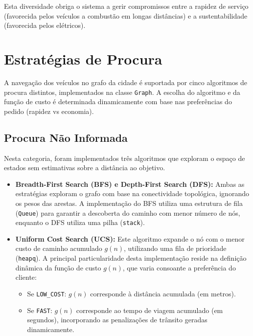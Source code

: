 \documentclass[11pt, a4paper, fleqn]{article}
\begin{document}
	Esta diversidade obriga o sistema a gerir compromissos entre a rapidez de serviço (favorecida pelos veículos a combustão em longas distâncias) e a sustentabilidade (favorecida pelos elétricos).
	
	
	
	\section{Estratégias de Procura}
	
	A navegação dos veículos no grafo da cidade é suportada por cinco algoritmos de procura distintos, implementados na classe \texttt{Graph}. A escolha do algoritmo e da função de custo é determinada dinamicamente com base nas preferências do pedido (rapidez vs economia).
	
	\subsection{Procura Não Informada}
	
	Nesta categoria, foram implementados três algoritmos que exploram o espaço de estados sem estimativas sobre a distância ao objetivo.
	
	\begin{itemize}
		\item \textbf{Breadth-First Search (BFS) e Depth-First Search (DFS):}
		Ambas as estratégias exploram o grafo com base na conectividade topológica, ignorando os pesos das arestas. A implementação do BFS utiliza uma estrutura de fila (\texttt{Queue}) para garantir a descoberta do caminho com menor número de nós, enquanto o DFS utiliza uma pilha (\texttt{stack}).
		
		\item \textbf{Uniform Cost Search (UCS):}
		Este algoritmo expande o nó com o menor custo de caminho acumulado $g(n)$, utilizando uma fila de prioridade (\texttt{heapq}). A principal particularidade desta implementação reside na definição dinâmica da função de custo $g(n)$, que varia consoante a preferência do cliente:
		\begin{itemize}
			\item Se \texttt{LOW\_COST}: $g(n)$ corresponde à distância acumulada (em metros).
			\item Se \texttt{FAST}: $g(n)$ corresponde ao tempo de viagem acumulado (em segundos), incorporando as penalizações de trânsito geradas dinamicamente.
		\end{itemize}
	\end{itemize}
	
\end{document}
